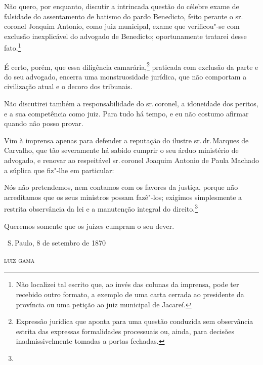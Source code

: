 Não quero, por enquanto, discutir a intrincada questão do célebre exame
de falsidade do assentamento de batismo do pardo Benedicto, feito
perante o sr.\,coronel Joaquim Antonio, como juiz municipal, exame que
verificou"-se com exclusão inexplicável do advogado de Benedicto;
oportunamente tratarei desse fato.\footnote{Não localizei tal escrito
  que, ao invés das colunas da imprensa, pode ter recebido outro
  formato, a exemplo de uma carta cerrada ao presidente da província ou
  uma petição ao juiz municipal de Jacareí.}

É certo, porém, que essa diligência camarária,\footnote{Expressão
  jurídica que aponta para uma questão conduzida sem observância estrita
  das expressas formalidades processuais ou, ainda, para decisões
  inadmissivelmente tomadas a portas fechadas.} praticada com exclusão
da parte e do seu advogado, encerra uma monstruosidade jurídica, que não
comportam a civilização atual e o decoro dos tribunais.

Não discutirei também a responsabilidade do sr.\,coronel, a idoneidade
dos peritos, e a sua competência como juiz. Para tudo há tempo, e eu não
costumo afirmar quando não posso provar.

Vim à imprensa apenas para defender a reputação do ilustre sr.\,dr.\,Marques de Carvalho, que tão severamente há sabido cumprir o seu árduo
ministério de advogado, e renovar ao respeitável sr.\,coronel Joaquim
Antonio de Paula Machado a súplica que fiz"-lhe em particular:

Nós não pretendemos, nem contamos com os favores da justiça, porque não
acreditamos que os seus ministros possam fazê"-los; exigimos simplesmente
a restrita observância da lei e a manutenção integral do
direito.\footnote{}

Queremos somente que os juízes cumpram o seu dever.

\bigskip

\hfill\ S.\,Paulo, 8 de setembro de 1870\smallskip

\hfill\textsc{luiz gama}

